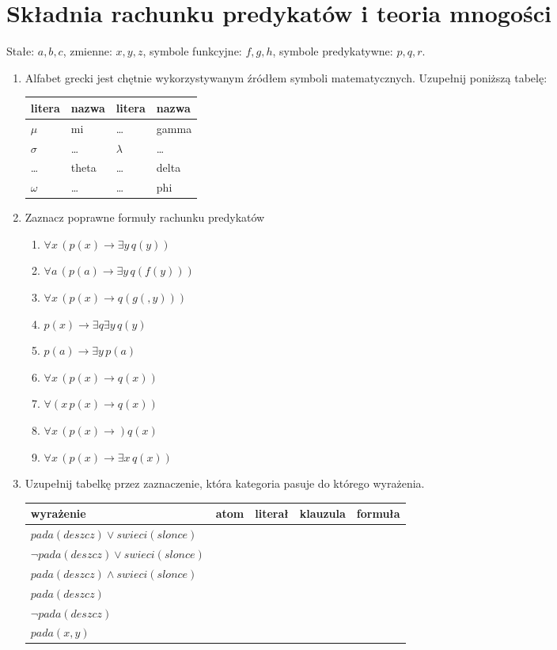 \documentclass{mwart}
\begin{document}
\section{Składnia rachunku predykatów i teoria mnogości}
Stałe: $a, b, c$, zmienne: $x, y, z$, symbole funkcyjne: $f, g, h$, symbole predykatywne: $p, q, r$.

\begin{enumerate}
\item Alfabet grecki jest chętnie wykorzystywanym źródłem symboli matematycznych. Uzupełnij poniższą tabelę:
\begin{tabular}{lp{6cm}|lp{6cm}}
litera & nazwa & litera & nazwa \\
\hline
$\mu$ & mi & \ldots & gamma \\
$\sigma$ & \ldots & $\lambda$ & \ldots \\
\ldots & theta & \ldots & delta \\
$\omega$ & \ldots & \ldots & phi \\
\end{tabular}
	\item Zaznacz poprawne formuły rachunku predykatów
		\begin{multicols}{3}
			\begin{enumerate}
				\item $\forall x\, (p(x)\to \exists y\, q(y))$
				\item $\forall a\, (p(a)\to \exists y\, q(f(y)))$
				\item $\forall x\, (p(x)\to q(g(, y)))$
				\item $p(x)\to \exists q\exists y\, q(y)$
				\item $p(a)\to \exists y\, p(a)$
				\item $\forall x\, (p(x)\to q(x))$
				\item $\forall (x\, p(x)\to q(x))$
				\item $\forall x\, (p(x)\to) q(x)$				
				\item $\forall x\, (p(x)\to \exists x\, q(x))$
			\end{enumerate}
		\end{multicols}
		
	\item Uzupełnij tabelkę przez zaznaczenie, która kategoria pasuje do którego wyrażenia.
	
	\begin{tabular}{|l|l|l|l|l|}
	\hline	
	wyrażenie & atom & literał & klauzula & formuła \\
	\hline
	$pada(deszcz) \lor swieci(slonce)$ & & & & \\
	\hline	
	$\lnot pada(deszcz) \lor swieci(slonce)$ & & & & \\
	\hline	
	$pada(deszcz) \land swieci(slonce)$ & & & & \\
	\hline	
	$pada(deszcz)$ & & & & \\
	\hline	
	$\lnot pada(deszcz)$ & & & & \\
	\hline	
	$pada(x, y)$ & & & & \\	
	\hline
	\end{tabular}



\end{enumerate}
\end{document}
